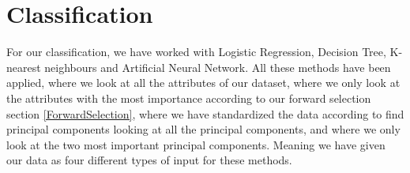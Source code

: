 \section{Classification}
\label{classification}
For our classification, we have worked with Logistic Regression, Decision Tree, K-nearest neighbours and Artificial Neural Network. All these methods have been applied, where we look at all the attributes of our dataset, where we only look at the attributes with the most importance according to our forward selection section \ref{ForwardSelection}, where we have standardized the data according to find principal components looking at all the principal components, and where we only look at the two most important principal components. Meaning we have given our data as four different types of input for these methods.







